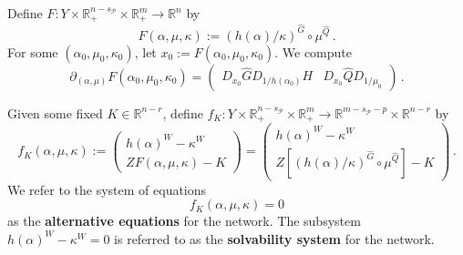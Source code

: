 \documentclass[11pt]{amsart}
\renewcommand{\k}{\kappa}
\newcommand{\R}{\mathbb{R}}
\newcommand{\wQ}{\widehat{Q}}
\newcommand{\wG}{\widehat{G}}
\newcommand{\wF}{\widehat{F}}
\newcommand{\mP}{\mathcal{P}}
\theoremstyle{definition}
\begin{document}
Define $F\colon Y \times \R^{n-s_\mP}_+ \times \R^m_+ \to \R^n$ by
\begin{equation}
\label{eq:F}
  F(\alpha,\mu,\k) := (h(\alpha)/\k)^{\wG} \circ \mu^{\wQ}\,.
\end{equation}
For some $(\alpha_0, \mu_0, \k_0)$, let $x_0:= F(\alpha_0,\mu_0,\k_0)$. We compute
\begin{equation}
\label{eqJF}
\partial_{(\alpha, \mu)} F(\alpha_0, \mu_0, \k_0) = \left(\begin{array}{cc}D_{x_0}\wG D_{1/h(\alpha_0)}H& D_{x_0}\wQ D_{1/\mu_0} \end{array}\right)\,.
\end{equation}

Given some fixed $K \in \R^{n-r}$, define $f_K\colon Y \times \R^{n-s_\mP}_+ \times \R^m_+ \to \R^{m-s_\mP-p} \times \R^{n-r}$ by
\begin{equation}
\label{eqalt}
f_K(\alpha, \mu, \k) := \left(\begin{array}{c}h(\alpha)^W - \k^W\\Z F(\alpha, \mu, \k) - K\end{array}\right) = \left(\begin{array}{c}h(\alpha)^W - \k^W\\Z[(h(\alpha)/\k)^{\wG}\circ \mu^{\wQ}] - K\end{array}\right)\,.
\end{equation}
We refer to the system of equations 
\[
f_K(\alpha, \mu, \k)=0
\]
as the {\bf alternative equations} for the network. The subsystem $h(\alpha)^W - \k^W = 0$ is referred to as the {\bf solvability system} for the network.
\end{document}
